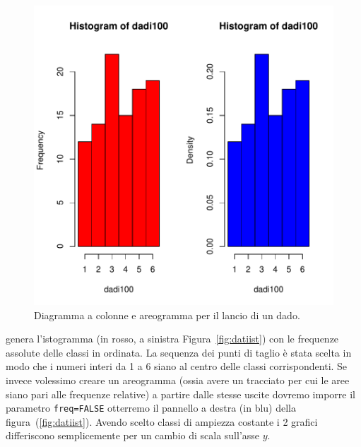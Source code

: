 \documentclass[onecolumn,12pt]{book}
\begin{document}
\begin{figure}[htbp]
\begin{center}
\includegraphics{RbookParte2-036}
\caption{ Diagramma a colonne e areogramma per il lancio di un dado.}
\label{fig:datiiist}
\end{center}
\end{figure}
genera l'istogramma (in rosso, a sinistra Figura~\ref{fig:datiist}) con le frequenze assolute delle classi in ordinata. La sequenza dei punti di taglio \`e stata scelta in modo che i numeri interi da 1 a 6 siano al centro delle classi corrispondenti. Se invece volessimo creare un areogramma  (ossia avere un tracciato per cui le aree siano pari alle frequenze relative) a partire dalle stesse uscite dovremo imporre il parametro \texttt{freq=FALSE} otterremo il pannello a destra (in blu) della figura~(\ref{fig:datiist}). Avendo scelto classi di ampiezza costante i 2 grafici differiscono semplicemente per un cambio di scala sull'asse $y$.
\end{document}
